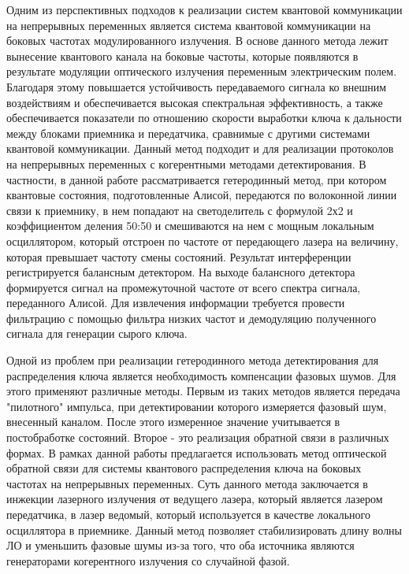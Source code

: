 Одним из перспективных подходов к реализации систем квантовой коммуникации на непрерывных переменных является система квантовой коммуникации на боковых частотах модулированного излучения. В основе данного метода лежит вынесение квантового канала на боковые частоты, которые появляются в результате модуляции оптического излучения переменным электрическим полем. Благодаря этому повышается устойчивость передаваемого сигнала ко внешним воздействиям и обеспечивается высокая спектральная эффективность, а также обеспечивается показатели по отношению скорости выработки ключа к дальности между блоками приемника и передатчика, сравнимые с другими системами квантовой коммуникации. Данный метод подходит и для реализации протоколов на непрерывных переменных с когерентными методами детектирования. В частности, в данной работе рассматривается гетеродинный метод, при котором квантовые состояния, подготовленные Алисой, передаются по волоконной линии связи к приемнику, в нем попадают на светоделитель с формулой 2х2 и коэффициентом деления 50:50 и смешиваются на нем с мощным локальным осциллятором, который отстроен по частоте от передающего лазера на величину, которая превышает частоту смены состояний. Результат интерференции регистрируется балансным детектором. На выходе балансного детектора формируется сигнал на промежуточной частоте от всего спектра сигнала, переданного Алисой. Для извлечения информации требуется провести фильтрацию с помощью фильтра низких частот и демодуляцию полученного сигнала для генерации сырого ключа. 

Одной из проблем при реализации гетеродинного метода детектирования для распределения ключа является необходимость компенсации фазовых шумов. Для этого применяют различные методы. Первым из таких методов является передача "пилотного" импульса, при детектировании которого измеряется фазовый шум, внесенный каналом. После этого измеренное значение учитывается в постобработке состояний. Второе - это реализация обратной связи в различных формах. В рамках данной работы предлагается использовать метод оптической обратной связи для системы квантового распределения ключа на боковых частотах на непрерывных переменных. Суть данного метода заключается в инжекции лазерного излучения от ведущего лазера, который является лазером передатчика, в лазер ведомый, который используется в качестве локального осциллятора в приемнике. Данный метод позволяет стабилизировать длину волны ЛО и уменьшить фазовые шумы из-за того, что оба источника являются генераторами когерентного излучения со случайной фазой.

